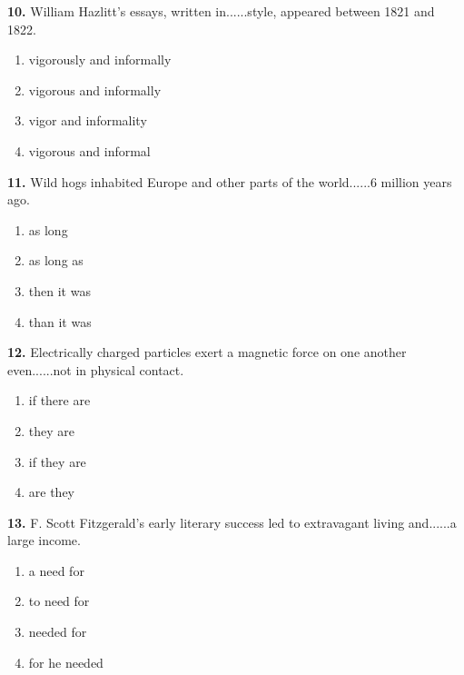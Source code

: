 \documentclass[12pt]{article}
\begin{document}
\par
\vspace{0.25\baselineskip}
\noindent\textbf{10.} William Hazlitt's essays, written in......style, appeared between 1821 and 1822.
\begin{enumerate}[label=(\Alph*),leftmargin=*,itemsep=0.2em]
\item vigorously and informally
\item vigorous and informally
\item vigor and informality
\item vigorous and informal
\end{enumerate}
\par
\vspace{0.25\baselineskip}
\noindent\textbf{11.} Wild hogs inhabited Europe and other parts of the world......6 million years ago.
\begin{enumerate}[label=(\Alph*),leftmargin=*,itemsep=0.2em]
\item as long
\item as long as
\item then it was
\item than it was
\end{enumerate}
\par
\vspace{0.25\baselineskip}
\noindent\textbf{12.} Electrically charged particles exert a magnetic force on one another even......not in physical contact.
\begin{enumerate}[label=(\Alph*),leftmargin=*,itemsep=0.2em]
\item if there are
\item they are
\item if they are
\item are they
\end{enumerate}
\par
\vspace{0.25\baselineskip}
\noindent\textbf{13.} F. Scott Fitzgerald's early literary success led to extravagant living and......a large income.
\begin{enumerate}[label=(\Alph*),leftmargin=*,itemsep=0.2em]
\item a need for
\item to need for
\item needed for
\item for he needed
\end{enumerate}
\par
\vspace{0.25\baselineskip}
\end{document}
